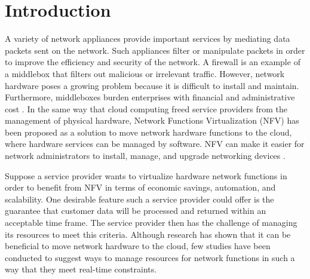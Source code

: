 \documentclass{sig-alternate}
\begin{document}
\section{Introduction}
\label{sec:intro}
A variety of network appliances provide important services by mediating data packets sent on the network. Such appliances filter or manipulate packets in order to improve the efficiency and security of the network. A firewall is an example of a middlebox that filters out malicious or irrelevant traffic. However, network hardware poses a growing problem because it is difficult to install and maintain. Furthermore, middleboxes burden enterprises with financial and administrative cost \cite{white_paper}. In the same way that cloud computing freed service providers from the management of physical hardware, Network Functions Virtualization (NFV) has been proposed as a solution to move network hardware functions to the cloud, where hardware services can be managed by software. NFV can make it easier for network administrators to install, manage, and upgrade networking devices \cite{white_paper}.

Suppose a service provider wants to virtualize hardware network functions in order to benefit from NFV in terms of economic savings, automation, and scalability. One desirable feature such a service provider could offer is the guarantee that customer data will be processed and returned within an acceptable time frame. The service provider then has the challenge of managing its resources to meet this criteria. Although research has shown that it can be beneficial to move network hardware to the cloud, few studies have been conducted to suggest ways to manage resources for network functions in such a way that they meet real-time constraints.
\end{document}
